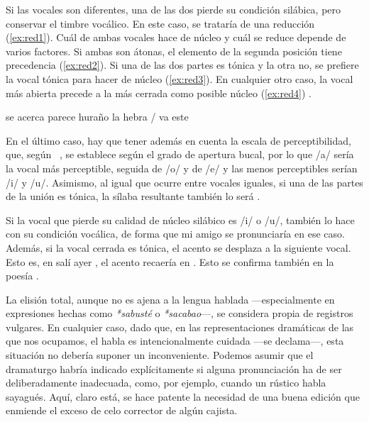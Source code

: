 Si las vocales son diferentes, una de las dos pierde su condición silábica, pero conservar el timbre vocálico. En este caso, se trataría de una reducción  (\ref{ex:red1}). Cuál de ambas vocales hace de núcleo y cuál se reduce depende de varios factores. Si ambas son átonas, el elemento de la segunda posición tiene precedencia (\ref{ex:red2}). Si una de las dos partes es tónica y la otra no, se prefiere la vocal tónica para hacer de núcleo (\ref{ex:red3}). En cualquier otro caso, la vocal más abierta precede a la más cerrada como posible núcleo (\ref{ex:red4}) \parencite[140-152]{navarrotomas2004}.
\begin{exe}
	\ex\label{ex:red1}\textlangle{}se acerca\textrangle{} 
		\ex\label{ex:red2}\textlangle{}parece huraño\textrangle{} 
		\ex\label{ex:red3}\textlangle{}la hebra\textrangle{} /
		\ex\label{ex:red4}\textlangle{}va este\textrangle{} 
\end{exe}
En el último caso, hay que tener además en cuenta la escala de perceptibilidad, que, según \citeauthor{navarrotomas2004}~\parencite*[25]{navarrotomas2004}, se establece según el grado de apertura bucal, por lo que /a/ sería la vocal más perceptible, seguida de /o/ y de /e/ y las menos perceptibles serían /i/ y /u/. Asimismo, al igual que ocurre entre vocales iguales, si una de las partes de la unión es tónica, la sílaba resultante también lo será \parencite*[142]{navarrotomas2004}.

Si la vocal que pierde su calidad de núcleo silábico es /i/ o /u/, también lo hace con su condición vocálica, de forma que \textlangle{}mi amigo\textrangle{} se pronunciaría  en ese caso. Además, si la vocal cerrada es tónica, el acento se desplaza a la siguiente vocal. Esto es, en \textlangle{}salí ayer\textrangle{} , el acento recaería en \ipa{[a]}. Esto se confirma también en la poesía \parencite{esgueva2004}.

La elisión total, aunque no es ajena a la lengua hablada —especialmente en expresiones hechas como \textit{*sabusté} o \textit{*sacabao}—, se considera propia de registros vulgares. En cualquier caso, dado que, en las representaciones dramáticas de las que nos ocupamos, el habla es intencionalmente cuidada —se declama—, esta situación no debería suponer un inconveniente. Podemos asumir que el dramaturgo habría indicado explícitamente si alguna pronunciación ha de ser deliberadamente inadecuada, como, por ejemplo, cuando un rústico habla sayagués. Aquí, claro está, se hace patente la necesidad de una buena edición que enmiende el exceso de celo corrector de algún cajista. 

